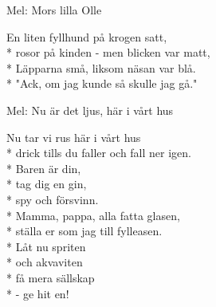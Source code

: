 \begin{SongText}
    \begin{SongInfo}
        Mel: Mors lilla Olle
    \end{SongInfo}
    \begin{SongVerse}
        En liten fyllhund på krogen satt,\\*%
        rosor på kinden - men blicken var matt,\\*%
        Läpparna små, liksom näsan var blå.\\*%
        "Ack, om jag kunde så skulle jag gå."
    \end{SongVerse}
\end{SongText}
\begin{SongText}
    \begin{SongInfo}
        Mel: Nu är det ljus, här i vårt hus
    \end{SongInfo}
    \begin{SongVerse}
        Nu tar vi rus här i vårt hus\\*%
        drick tills du faller och fall ner igen.\\*%
        Baren är din,\\*%
        tag dig en gin,\\*%
        spy och försvinn.\\*%
        Mamma, pappa, alla fatta glasen,\\*%
        ställa er som jag till fylleasen.\\*%
        Låt nu spriten\\*%
        och akvaviten\\*%
        få mera sällskap\\*%
        - ge hit en!
    \end{SongVerse}
\end{SongText}
